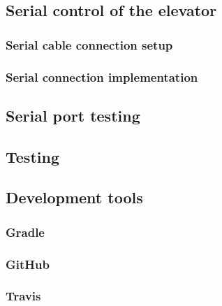 \documentclass[a4paper, 12pt]{article}
\begin{document}
\subsection{Serial control of the elevator}

\subsubsection{Serial cable connection setup}

\subsubsection{Serial connection implementation}

\subsection{Serial port testing}

\subsection{Testing}
\subsection{Development tools}

\subsubsection{Gradle}

\subsubsection{GitHub}

\subsubsection{Travis}



\end{document}
